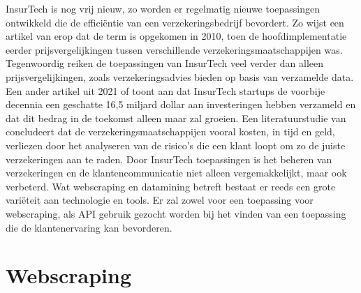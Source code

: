 InsurTech is nog vrij nieuw, zo worden er regelmatig nieuwe toepassingen ontwikkeld die de efficiëntie van een verzekeringsbedrijf bevordert. Zo wijst een artikel van \textcite{Institute2020} erop dat de term is opgekomen in 2010, toen de hoofdimplementatie eerder prijsvergelijkingen tussen verschillende verzekeringsmaatschappijen was. Tegenwoordig reiken de toepassingen van InsurTech veel verder dan alleen prijsvergelijkingen, zoals verzekeringsadvies bieden op basis van verzamelde data. Een ander artikel uit 2021 of \textcite{InsuranceCommissioners2021} toont aan dat InsurTech startups de voorbije decennia een geschatte 16,5 miljard dollar aan investeringen hebben verzameld en dat dit bedrag in de toekomst alleen maar zal groeien. Een literatuurstudie van \textcite{inproceedings} concludeert dat de verzekeringsmaatschappijen vooral kosten, in tijd en geld, verliezen door het analyseren van de risico’s die een klant loopt om zo de juiste verzekeringen aan te raden. Door InsurTech toepassingen is het beheren van verzekeringen en de klantencommunicatie niet alleen vergemakkelijkt, maar ook verbeterd. Wat webscraping en datamining betreft bestaat er reeds een grote variëteit aan technologie en tools. Er zal zowel voor een toepassing voor webscraping, als API gebruik gezocht worden bij het vinden van een toepassing die de klantenervaring kan bevorderen.



\section{Webscraping}

